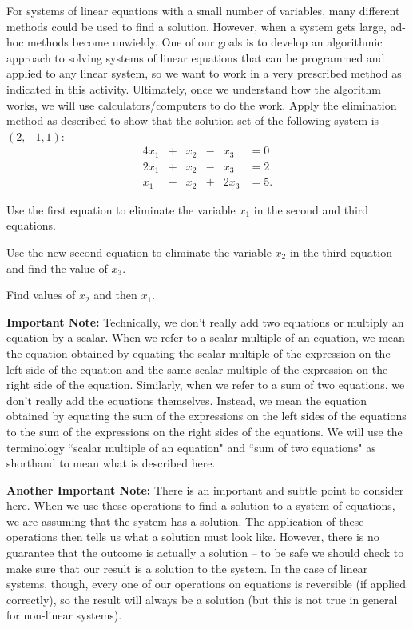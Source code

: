 \begin{activity} For systems of linear equations with a small number of variables, many different methods could be used to find a solution. However, when a system gets large, ad-hoc methods become unwieldy. One of our goals is to develop an algorithmic approach to solving systems of linear equations that can be programmed and applied to any linear system, so we want to work in a very prescribed method as indicated in this activity. Ultimately, once we understand how the algorithm works, we will use calculators/computers to do the work. Apply the elimination method as described to show that the solution set of the following system is $(2, -1, 1)$:
\begin{alignat*}{4}
x_1 &{}+{}& x_2 &{}-{}& x_3 &= 0   \\
2x_1 &{}+{}& x_2 &{}-{}& x_3 &= 2  \\
x_1&{}-{}&x_2 &{}+{}& 2x_3 &= 5. 
\end{alignat*}
	\ba
	\item Use the first equation to eliminate the variable $x_1$ in the second and third equations.
	
	\item Use the new second equation to eliminate the variable $x_2$ in the third equation and find the value of $x_3$. 
	
	\item Find values of $x_2$ and then $x_1$.

	
	\ea
	
\end{activity}



\noindent \textbf{Important Note:} Technically, we don't really add two equations or multiply an equation by a scalar. When we refer to a scalar multiple of an equation, we mean the equation obtained by equating the scalar multiple of the expression on the left side of the equation and the same scalar multiple of the expression on the right side of the equation. Similarly, when we refer to a sum of two equations, we don't really add the equations themselves. Instead, we mean the equation obtained by equating the sum of the expressions on the left sides of the equations to the sum of the expressions on the right sides of the equations. We will use the terminology ``scalar multiple of an equation" and ``sum of two equations" as shorthand to mean what is described here.


\noindent \textbf{Another Important Note:} There is an important and subtle point to consider here. When we use these operations to find a solution to a system of equations, we are assuming that the system has a solution. The application of these operations then tells us what a solution must look like. However, there is no guarantee that the outcome is actually a solution -- to be safe we should check to make sure that our result is a solution to the system. In the case of linear systems, though, every one of our operations on equations is reversible (if applied correctly), so the result will always be a solution (but this is not true in general for non-linear systems).  


